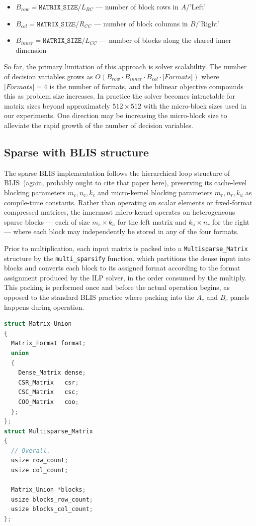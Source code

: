 \documentclass[sigconf]{acmart}
\begin{document}
\begin{itemize}
    \item $B_{row} = \texttt{MATRIX\_SIZE} / L_{RC}$ --- number of block rows in $A$/'Left'
    \item $B_{col} = \texttt{MATRIX\_SIZE} / R_{CC}$ --- number of block columns in $B$/'Right'
    \item $B_{inner} = \texttt{MATRIX\_SIZE} / L_{CC}$ --- number of blocks along the shared inner dimension
\end{itemize}

So far, the primary limitation of this approach is solver scalability. The number of decision
variables grows as $O(B_{row} \cdot B_{inner} \cdot B_{col} \cdot |Formats|)$
where $|Formats| = 4$ is the number of
formats, and the bilinear objective compounds this as problem size increases. In
practice the solver becomes intractable for matrix sizes beyond approximately
$512 \times 512$ with the micro-block sizes used in our experiments. One direction may be
increasing the micro-block size to alleviate the rapid growth of the
number of decision variables.

\subsection{Sparse with BLIS structure}

The sparse BLIS implementation follows the hierarchical loop
structure of BLIS~(again, probably ought to cite that paper here),
preserving its cache-level blocking parameters $m_c, n_c, k_c$ and micro-kernel blocking
parameters $m_r, n_r, k_u$ as compile-time constants. Rather than operating on scalar
elements or fixed-format compressed matrices, the innermost micro-kernel operates on
heterogeneous sparse blocks — each of size $m_r \times k_u$ for the left matrix and
$k_u \times n_r$ for the right — where each block may independently be stored in any
of the four formats.

Prior to multiplication, each input matrix is packed into a \texttt{Multisparse\_Matrix}
structure by the \texttt{multi\_sparsify} function, which partitions the dense input into
blocks and converts each block to its assigned format according to the format assignment
produced by the ILP solver, in the order consumed by the multiply.
This packing is performed once and before the actual operation begins, as opposed
to the standard BLIS practice where packing into the $A_c$ and $B_c$ panels happens
during operation.

\begin{lstlisting}[language=C, caption={Multisparse Matrix struct}]
struct Matrix_Union
{
  Matrix_Format format;
  union
  {
    Dense_Matrix dense;
    CSR_Matrix   csr;
    CSC_Matrix   csc;
    COO_Matrix   coo;
  };
};
struct Multisparse_Matrix
{
  // Overall.
  usize row_count;
  usize col_count;

  Matrix_Union *blocks;
  usize blocks_row_count;
  usize blocks_col_count;
};
\end{lstlisting}
\end{document}
